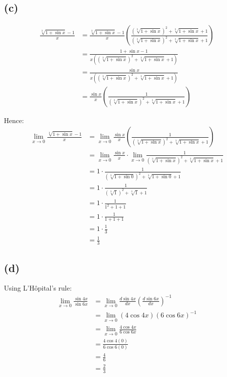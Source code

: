 \documentclass[11pt]{article}
\begin{document}
\subsection{(c)}
\label{sec:orgf98a100}

\begin{align*}
\frac{\sqrt[3]{1 + \sin x} - 1}{x} &= \frac{\sqrt[3]{1 + \sin x} - 1}{x} \left( \frac{(\sqrt[3]{1 + \sin x})^2 + \sqrt[3]{1 + \sin x} + 1}{(\sqrt[3]{1 + \sin x})^2 + \sqrt[3]{1 + \sin x} + 1} \right) \\
&= \frac{1 + \sin x - 1}{x((\sqrt[3]{1 + \sin x})^2 + \sqrt[3]{1 + \sin x} + 1)} \\
&= \frac{\sin x}{x((\sqrt[3]{1 + \sin x})^2 + \sqrt[3]{1 + \sin x} + 1)} \\
&= \frac{\sin x}{x} \left(\frac{1}{(\sqrt[3]{1 + \sin x})^2 + \sqrt[3]{1 + \sin x} + 1} \right)
\end{align*}

Hence:
\begin{align*}
\lim_{x \rightarrow 0} \frac{\sqrt[3]{1 + \sin x} - 1}{x} &= \lim_{x \rightarrow 0} \frac{\sin x}{x} \left(\frac{1}{(\sqrt[3]{1 + \sin x})^2 + \sqrt[3]{1 + \sin x} + 1} \right) \\
&= \lim_{x \rightarrow 0} \frac{\sin x}{x} \cdot \lim_{x \rightarrow 0} \frac{1}{(\sqrt[3]{1 + \sin x})^2 + \sqrt[3]{1 + \sin x} + 1} \\
&= 1 \cdot \frac{1}{(\sqrt[3]{1 + \sin 0})^2 + \sqrt[3]{1 + \sin 0} + 1} \\
&= 1 \cdot \frac{1}{(\sqrt[3]{1})^2 + \sqrt[3]{1} + 1} \\
&= 1 \cdot \frac{1}{1^2 + 1 + 1} \\
&= 1 \cdot \frac{1}{1 + 1 + 1} \\
&= 1 \cdot \frac{1}{3} \\
&= \frac{1}{3}
\end{align*}

\subsection{(d)}
\label{sec:orgbdcac06}

Using L'H\(\text{\^o}\)pital's rule:
\begin{align*}
\lim_{x \rightarrow 0} \frac{\sin 4x}{\sin 6x} &= \lim_{x \rightarrow 0} \frac{d \sin 4x}{dx} \left( \frac{d \sin 6x}{dx} \right)^{-1} \\
&= \lim_{x \rightarrow 0} (4 \cos 4x)(6 \cos 6x)^{-1} \\
&= \lim_{x \rightarrow 0} \frac{4 \cos 4x}{6 \cos 6x} \\
&= \frac{4 \cos 4(0)}{6 \cos 6(0)} \\
&= \frac{4}{6} \\
&= \frac{2}{3}
\end{align*}
\end{document}
